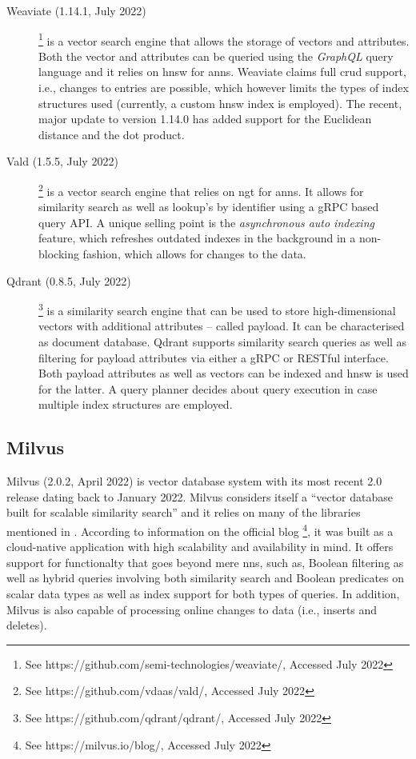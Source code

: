 \begin{description}
    \item[Weaviate (1.14.1, July 2022)] \footnote{See https://github.com/semi-technologies/weaviate/, Accessed July 2022} is a vector search engine that allows the storage of vectors and attributes. Both the vector and attributes can be queried using the \emph{GraphQL} query language and it relies on \acrshort{hnsw} \cite{Malkov:2018Efficient} for \acrshort{anns}. Weaviate claims full \acrshort{crud} support, i.e., changes to entries are possible, which however limits the types of index structures used (currently, a custom \acrshort{hnsw} index is employed). The recent, major update to version 1.14.0 has added support for the Euclidean distance and the dot product.
    \item[Vald (1.5.5, July 2022)] \footnote{See https://github.com/vdaas/vald/, Accessed July 2022} is a vector search engine that relies on \acrshort{ngt} for \acrshort{anns}. It allows for similarity search as well as lookup's by identifier using a gRPC based query API. A unique selling point is the \emph{asynchronous auto indexing} feature, which refreshes outdated indexes in the background in a non-blocking fashion, which allows for changes to the data.
    \item[Qdrant (0.8.5, July 2022)] \footnote{See https://github.com/qdrant/qdrant/, Accessed July 2022} is a similarity search engine that can be used to store high-dimensional vectors with additional attributes -- called payload. It can be characterised as document database. Qdrant supports similarity search queries as well as filtering for payload attributes via either a gRPC or RESTful interface. Both payload attributes as well as vectors can be indexed and \acrshort{hnsw} \cite{Malkov:2018Efficient} is used for the latter. A query planner decides about query execution in case multiple index structures are employed.
\end{description}

\subsection{Milvus}
\label{section:milvus}

Milvus (2.0.2, April 2022) \cite{Wang:2021Milvus} is vector database system with its most recent 2.0 release dating back to January 2022. Milvus considers itself a ``vector database built for scalable similarity search'' and it relies on many of the libraries mentioned in . According to information on the official blog \footnote{See https://milvus.io/blog/, Accessed July 2022}, it was built as a cloud-native application with high scalability and availability in mind. It offers support for functionalty that goes beyond mere \acrshort{nns}, such as, Boolean filtering as well as hybrid queries involving both similarity search and Boolean predicates on scalar data types as well as index support for both types of queries. In addition, Milvus is also capable of processing online changes to data (i.e., inserts and deletes).

